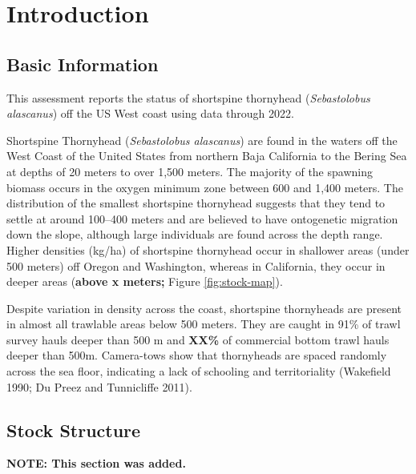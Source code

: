 \documentclass[11pt,
  english,
  letterpaper,
]{article}
\begin{document}
\pagebreak
\setlength{\parskip}{5mm plus1mm minus1mm}
\setcounter{page}{1}
\renewcommand{\thefigure}{\arabic{figure}}
\renewcommand{\thetable}{\arabic{table}}
\setcounter{table}{0}
\setcounter{figure}{0}

\hypertarget{introduction}{%
\section{Introduction}\label{introduction}}

\hypertarget{basic-information}{%
\subsection{Basic Information}\label{basic-information}}

This assessment reports the status of shortspine thornyhead (\emph{Sebastolobus alascanus}) off the US West coast using data through 2022.

Shortspine Thornyhead (\emph{Sebastolobus alascanus}) are found in the waters off the West Coast of the United States from northern Baja California to the Bering Sea at depths of 20 meters to over 1,500 meters. The majority of the spawning biomass occurs in the oxygen minimum zone between 600 and 1,400 meters. The distribution of the smallest shortspine thornyhead suggests that they tend to settle at around 100--400 meters and are believed to have ontogenetic migration down the slope, although large individuals are found across the depth range. Higher densities (kg/ha) of shortspine thornyhead occur in shallower areas (under 500 meters) off Oregon and Washington, whereas in California, they occur in deeper areas (\textbf{above x meters;} Figure \ref{fig:stock-map}).

Despite variation in density across the coast, shortspine thornyheads are present in almost all trawlable areas below 500 meters. They are caught in 91\% of trawl survey hauls deeper than 500 m and \textbf{XX\%} of commercial bottom trawl hauls deeper than 500m. Camera-tows show that thornyheads are spaced randomly across the sea floor, indicating a lack of schooling and territoriality (Wakefield 1990; Du Preez and Tunnicliffe 2011).

\hypertarget{stock-structure}{%
\subsection{Stock Structure}\label{stock-structure}}

\textbf{NOTE: This section was added.}
\end{document}
